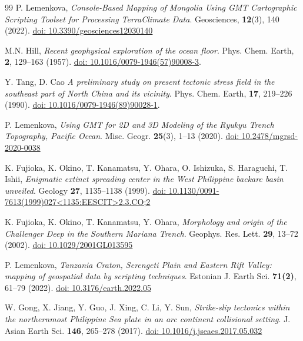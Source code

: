 \documentclass{rrparticle}
\begin{document}
\begin{thebibliography}{99}
P. Lemenkova, \emph{Console-Based Mapping of Mongolia Using GMT Cartographic Scripting Toolset for Processing TerraClimate Data}. Geosciences, \textbf{12}(3), 140 (2022). \href{https://doi.org/10.3390/geosciences12030140}{doi: 10.3390/geosciences12030140}

 M.N. Hill, \emph{Recent geophysical exploration of the ocean floor}. Phys. Chem. Earth, \textbf{2}, 129--163 (1957). \href{https://doi.org/10.1016/0079-1946(57)90008-3}{doi: 10.1016/0079-1946(57)90008-3}.

 Y. Tang, D. Cao \emph{A preliminary study on present tectonic stress field in the southeast part of North China and its vicinity}. Phys. Chem. Earth, \textbf{17}, 219--226 (1990). \href{https://doi.org/10.1016/0079-1946(89)90028-1}{doi: 10.1016/0079-1946(89)90028-1}.

 P. Lemenkova, \emph{Using GMT for 2D and 3D Modeling of the Ryukyu Trench Topography, Pacific Ocean}. Misc. Geogr. \textbf{25}(3), 1--13 (2020). \href{https://doi.org/10.2478/mgrsd-2020-0038}{doi: 10.2478/mgrsd-2020-0038}

 K. Fujioka, K. Okino, T. Kanamatsu, Y. Ohara, O. Ishizuka, S. Haraguchi, T. Ishii, \emph{Enigmatic extinct spreading center in the West Philippine backarc basin unveiled}. Geology \textbf{27}, 1135--1138 (1999). \href{https://doi.org/10.1130/0091-7613(1999)027<1135:EESCIT>2.3.CO;2}{doi: 10.1130/0091-7613(1999)027<1135:EESCIT>2.3.CO;2}

 K. Fujioka, K. Okino, T. Kanamatsu, Y. Ohara, \emph{Morphology and origin of the Challenger Deep in the Southern Mariana Trench}. Geophys. Res. Lett. \textbf{29}, 13--72 (2002). \href{https://doi.org/10.1029/2001GL013595}{doi: 10.1029/2001GL013595}

 P. Lemenkova, \emph{Tanzania Craton, Serengeti Plain and Eastern Rift Valley: mapping of geospatial data by scripting techniques}. Estonian J. Earth Sci. \textbf{71(2)}, 61--79 (2022). \href{https://doi.org/10.3176/earth.2022.05}{doi: 10.3176/earth.2022.05}

 W. Gong, X. Jiang, Y. Guo, J. Xing, C. Li, Y. Sun, \emph{Strike-slip tectonics within the northernmost Philippine Sea plate in an arc continent collisional setting}. J. Asian Earth Sci. \textbf{146}, 265--278 (2017). \href{https://doi.org/10.1016/j.jseaes.2017.05.032}{doi: 10.1016/j.jseaes.2017.05.032}


\end{thebibliography}
\end{document}
